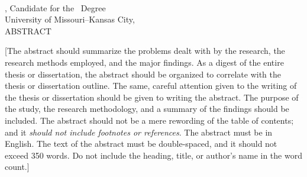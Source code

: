 \begin{center}
\vspace*{0.01in}
\large{\MakeUppercase{\MyThesisTitle}}\\
\vspace{24pt}
\normalsize{
  \MyName, Candidate for the \MyDegree\ Degree\\
  University of Missouri--Kansas City, \MyDegreeAwardYear\\
  \vspace{24pt}
  \MakeUppercase{Abstract}
  \vspace{12pt}
}
\end{center}

\doublespacing



[The abstract should summarize the problems dealt with by the research, the research methods employed, and the major findings. As a digest of the entire thesis or dissertation, the abstract should be organized to correlate with the thesis or dissertation outline. The same, careful attention given to the writing of the thesis or dissertation should be given to writing the abstract. The purpose of the study, the research methodology, and a summary of the findings should be included. The abstract should not be a mere rewording of the table of contents; and it \textit{should not include footnotes or references}. The abstract must be in English. The text of the abstract must be double-spaced, and it should not exceed 350 words. Do not include the heading, title, or author's name in the word count.]
